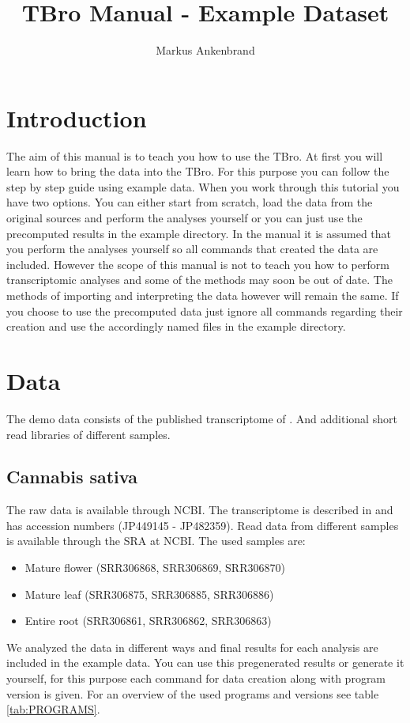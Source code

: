 \documentclass[english]{scrartcl}
\begin{document}
\title{TBro Manual - Example Dataset}
\author{Markus Ankenbrand}
\maketitle

\section{Introduction}
The aim of this manual is to teach you how to use the TBro. At first you will
learn how to bring the data into the TBro. For this purpose you can follow the
step by step guide using example data. When you work through this tutorial you
have two options. You can either start from scratch, load the data from the
original sources and perform the analyses yourself or you can just use the
precomputed results in the example directory. In the manual it is assumed that
you perform the analyses yourself so all commands that created the data are
included. However the scope of this manual is not to teach you how to perform
transcriptomic analyses and some of the methods may soon be out of date. The
methods of importing and interpreting the data however will remain the same. If
you choose to use the precomputed data just ignore all commands regarding their
creation and use the accordingly named files in the example directory.

\section{Data}
The demo data consists of the published transcriptome of . And
additional short read libraries of different samples.

\subsection{Cannabis sativa}
The raw data is available through NCBI. The transcriptome is described
in \cite{CSATIVA} and has accession numbers (JP449145 - JP482359). Read data
from different samples is available through the SRA at NCBI. The used samples
are:
\begin{itemize}
\item Mature flower (SRR306868, SRR306869, SRR306870)
\item Mature leaf (SRR306875, SRR306885, SRR306886)
\item Entire root (SRR306861, SRR306862, SRR306863)
\end{itemize}
We analyzed the data in different ways and final results for each
analysis are included in the example data. You can use this pregenerated results
or generate it yourself, for this purpose each command for data creation along
with program version is given. For an overview of the used programs and versions
see table \ref{tab:PROGRAMS}.
\end{document}
